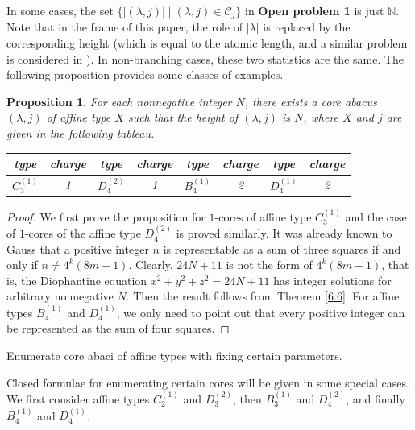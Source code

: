 \documentclass[11pt]{amsart}
\theoremstyle{plain}
\numberwithin{equation}{subsection}
\newtheorem{proposition}[theorem]{Proposition}
\newcommand{\lam}{\lambda}
\begin{document}
In some cases, the set $\{|(\lam, j)|\mid (\lam, j)\in \mathcal{C}_j\}$ in {\bf Open problem 1} is just $\mathbb{N}$.
Note that in the frame of this paper, the role of $|\lam|$ is replaced by the corresponding height 
(which is equal to the atomic length, and a similar problem is considered in \cite{CGJL}). 
In non-branching cases, these two statistics are the same.
The following proposition provides some classes of examples.

\begin{proposition}\label{6.12}
For each nonnegative integer $N$, there exists a core abacus $(\lam, j)$ of affine type $X$ such that the height of $(\lam, j)$ is $N$,
where $X$ and $j$ are given in the following tableau.
\begin{table}[h] 
\centering
\begin{tabular}{|c|c|c|c|c|c|c|c|} 
\hline       		
{\rm type} & {\rm charge} & {\rm type} & {\rm charge} & {\rm type} & {\rm charge} & {\rm type} & {\rm charge} \\
\hline
$C_3^{(1)}$ & 1 & $D_4^{(2)}$ & 1 & $B_4^{(1)}$ & 2 &  $D_4^{(1)}$ & 2\\
\hline
\end{tabular}
\end{table}
\end{proposition}

\begin{proof}
We first prove the proposition for $1$-cores of affine type $C_3^{(1)}$ 
and the case of $1$-cores of the affine type $D_4^{(2)}$ is proved similarly.
It was already known to Gauss that a positive integer $n$ is representable 
as a sum of three squares if and only if $n\neq 4^k(8m-1)$.
Clearly, $24N+11$ is not the form of $4^k(8m-1)$, that is, 
the Diophantine equation $x^2+y^2+z^2=24N+11$ has integer solutions for arbitrary nonnegative $N$.
Then the result follows from Theorem \ref{6.6}. For affine types $B_4^{(1)}$ and $D_4^{(1)}$, 
we only need to point out that every positive integer can be 
represented as the sum of four squares.
\end{proof}

\smallskip

 Enumerate core abaci of affine types with fixing certain parameters.

\smallskip

Closed formulae for enumerating certain cores will be given in some special cases. 
We first consider affine types $C_2^{(1)}$ and $D_3^{(2)}$, 
then $B_3^{(1)}$ and $D_4^{(2)}$, and finally $B_4^{(1)}$ and $D_4^{(1)}$.
\end{document}
